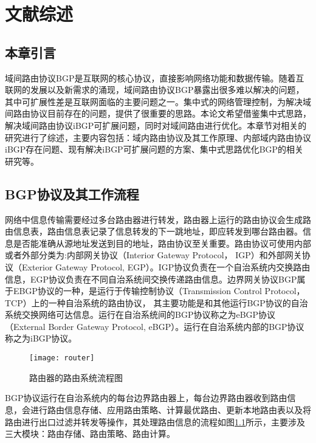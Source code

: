 \chapter{文献综述}
\label{cha:review}

\section{本章引言}
域间路由协议BGP是互联网的核心协议，直接影响网络功能和数据传输。随着互联网的发展以及新需求的涌现，域间路由协议BGP暴露出很多难以解决的问题，其中可扩展性差是互联网面临的主要问题之一。集中式的网络管理控制，为解决域间路由协议目前存在的问题，提供了很重要的思路。本论文希望借鉴集中式思路，解决域间路由协议iBGP可扩展问题，同时对域间路由进行优化。本章节对相关的研究进行了综述，主要内容包括：域内路由协议及其工作原理、内部域内路由协议iBGP存在问题、现有解决iBGP可扩展问题的方案、集中式思路优化BGP的相关研究等。

\section{BGP协议及其工作流程}

网络中信息传输需要经过多台路由器进行转发，路由器上运行的路由协议会生成路由信息表，路由信息表记录了信息转发的下一跳地址，即应转发到哪台路由器。信息是否能准确从源地址发送到目的地址，路由协议至关重要。路由协议\cite{DianeTeare2016CCNP}可使用内部或者外部分类为:内部网关协议（Interior Gateway Protocol， IGP）和外部网关协议（Exterior Gateway Protocol, EGP）。IGP协议负责在一个自治系统内交换路由信息，EGP协议负责在不同自治系统间交换传递路由信息。边界网关协议BGP\cite{rfc1771}属于EBGP协议的一种，是运行于传输控制协议（Transmission Control Protocol， TCP）上的一种自治系统的路由协议， 其主要功能是和其他运行BGP协议的自治系统交换网络可达信息。运行在自治系统间的BGP协议称之为eBGP协议（External Border Gateway Protocol, eBGP）。运行在自治系统内部的BGP协议称之为iBGP协议。

\begin{figure}
  \centering
  \texttt{[image: router]}
  \caption{路由器的路由系统流程图\cite{journals/saem/KumarK14}}
  \label{fig:router}
\end{figure}

BGP协议运行在自治系统内的每台边界路由器上，每台边界路由器收到路由信息，会进行路由信息存储、应用路由策略、计算最优路由、更新本地路由表以及将路由进行出口过滤并转发等操作，其处理路由信息的流程如图\ref{fig:router}所示，主要涉及三大模块：路由存储、路由策略、路由计算。

